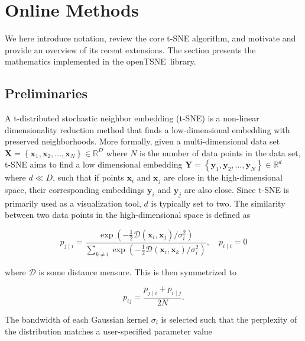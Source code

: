 \documentclass[letter]{article}
\newcommand{\opentsne}{\textsf{openTSNE}}
\begin{document}
\eject
\fontsize{8}{10}\selectfont
\section*{Online Methods}

We here introduce notation, review the core t-SNE algorithm, and motivate and provide an overview of its recent extensions. The section presents the mathematics implemented in the \opentsne\ library.

\subsection*{Preliminaries}

A t-distributed stochastic neighbor embedding (t-SNE) is a non-linear dimensionality reduction method that finds a low-dimensional embedding with preserved neighborhoods. More formally, given a multi-dimensional data set $\mathbf{X} = \left \{ \mathbf{x}_1, \mathbf{x}_2, \dots, \mathbf{x}_N \right \} \in \mathbb{R}^D$ where $N$ is the number of data points in the data set, t-SNE aims to find a low dimensional embedding $\mathbf{Y} = \left \{ \mathbf{y}_1, \mathbf{y}_2, \dots, \mathbf{y}_N \right\} \in \mathbb{R}^d$ where $d \ll D$, such that if points $\mathbf{x}_i$ and $\mathbf{x}_j$ are close in the high-dimensional space, their corresponding embeddings $\mathbf{y}_i$ and $\mathbf{y}_j$ are also close. Since t-SNE is primarily used as a visualization tool, $d$ is typically set to two. The similarity between two data points in the high-dimensional space is defined as

\begin{equation}
p_{j \mid i} = \frac{\exp \left ( -\frac{1}{2} \mathcal{D}(\mathbf{x}_i, \mathbf{x}_j ) / \sigma_i^2 \right )}
{\sum_{k \neq i } \exp \left ( -\frac{1}{2} \mathcal{D}(\mathbf{x}_i, \mathbf{x}_k ) / \sigma_i^2 \right )}, \quad p_{i \mid i} = 0
\label{eq:gaussian_kernel}
\end{equation}

\noindent where $\mathcal{D}$ is some distance measure. This is then
symmetrized to

\begin{equation}
p_{ij} = \frac{p_{j \mid i} + p_{i \mid j}}{2N}.
\label{eq:symmetrize}
\end{equation}

The bandwidth of each Gaussian kernel $\sigma_i$ is selected such that the perplexity of the distribution matches a user-specified parameter value
\end{document}
